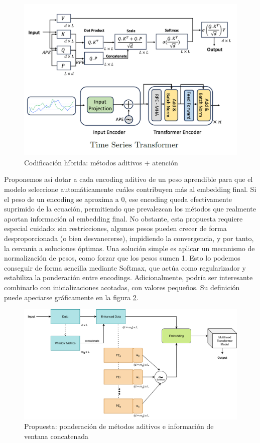 \begin{figure}[!ht]
	\centering
	\includegraphics[scale=0.35]{img/hybridpaper.png}
	\caption{Codificación híbrida: métodos aditivos + atención \cite{irani2025positionalencodingtransformerbasedtime}}
	\label{hybridpaper}
\end{figure}


Proponemos así dotar a cada encoding aditivo de un peso aprendible para que el modelo seleccione automáticamente cuáles contribuyen más al embedding final. Si el peso de un encoding se aproxima a 0, ese encoding queda efectivamente suprimido de la ecuación, permitiendo que prevalezcan los métodos que realmente aportan información al embedding final. No obstante, esta propuesta requiere especial cuidado: sin restricciones, algunos pesos pueden crecer de forma desproporcionada (o bien desvanecerse), impidiendo la convergencia, y por tanto, la cercanía a soluciones óptimas. Una solución simple es aplicar un mecanismo de normalización de pesos, como forzar que los pesos sumen 1. Esto lo podemos conseguir de forma sencilla mediante Softmax, que actúa como regularizador y estabiliza la ponderación entre encodings. Adicionalmente, podría ser interesante combinarlo con inicializaciones acotadas, con valores pequeños. Su definición puede apeciarse gráficamente en la figura \ref{enhancedhybrid}.\\

\begin{figure}[!ht]
	\centering
	\includegraphics[scale=0.6]{img/enhancedhybrid.png}
	\caption{Propuesta: ponderación de métodos aditivos e información de ventana concatenada}
	\label{enhancedhybrid}
\end{figure}

